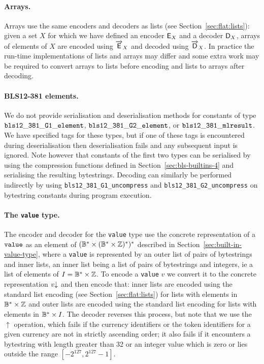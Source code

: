 \paragraph{Arrays.} Arrays use the same encoders and decoders as lists (see
Section~\ref{sec:flat:lists}): given a set $X$ for which we have defined an
encoder $\mathsf{E}_X$ and a decoder $\mathsf{D}_X$, arrays of elements of $X$ are encoded using
$\overrightarrow{\mathsf{E}}_X$ and decoded using $\overrightarrow{\mathsf{D}}_X$.  In practice the run-time
implementations of lists and arrays may differ and some extra work may be
required to convert arrays to lists before encoding and lists to arrays after
decoding.

\paragraph{BLS12-381 elements.}
We do not provide serialisation and deserialisation methods for constants of type
$\mathtt{bls12\_381\_G1\_element}$, $\mathtt{bls12\_381\_G2\_element}$, or
$\mathtt{bls12\_381\_mlresult}$.  We have specified tags for these types, but if one
of these tags is encountered during deserialisation then deserialisation fails
and any subsequent input is ignored.  Note however that constants of the first
two types can be serialised by using the compression functions defined in
Section~\ref{sec:bls-builtins-4} and serialising the resulting bytestrings.
Decoding can similarly be performed indirectly by using
\texttt{bls12\_381\_G1\_uncompress} and \texttt{bls12\_381\_G2\_uncompress} on
bytestring constants during program execution.


\paragraph{The \texttt{value} type.}
The encoder and decoder for the \texttt{value} type use the concrete
representation of a $\mathtt{value}$ as an element of $(\mathbb{B}^* \times (\mathbb{B}^*\times
\mathbb{Z})^*)^*$ described in Section~\ref{sec:built-in-value-type}, where a
\texttt{value} is represented by an outer list of pairs of bytestrings and inner
lists, an inner list being a list of pairs of bytestrings and integers, ie a
list of elements of $I = \mathbb{B}^*\times \mathbb{Z}$.  To encode a \texttt{value} $v$ we
convert it to the concrete representation $\flatten{v}$ and then encode that:
inner lists are encoded using the standard list encoding (see
Section~\ref{sec:flat:lists}) for lists with elements in $\mathbb{B}^*\times \mathbb{Z}$ and
outer lists are encoded using the standard list encoding for lists with elements
in $\mathbb{B}^* \times I$.  The decoder reverses this process, but note that we use the
$\uparrow$ operation, which fails if the currency identifiers or the token
identifiers for a given currency are not in strictly ascending order; it also
fails if it encounters a bytestring with length greater than 32 or an integer
value which is zero or lies outside the range $[-2^{127}, 2^{127}-1]$.

